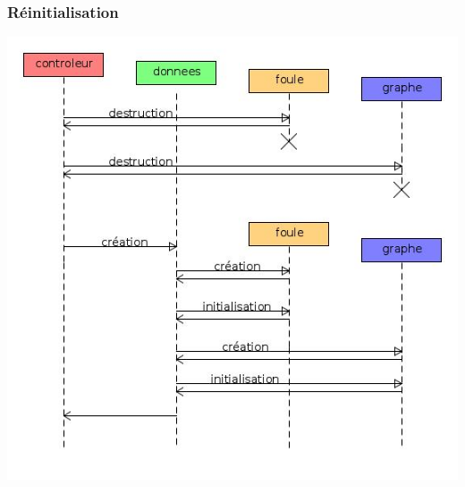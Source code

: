 \subsubsection{Réinitialisation}
\includegraphics[width=.95\textwidth]{./illustration/sequenceReinitialisation2}

